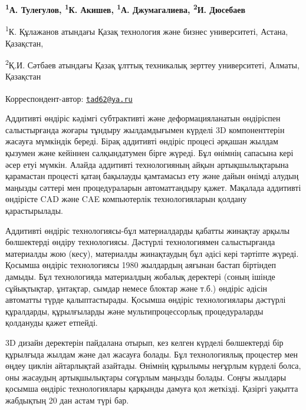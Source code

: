 
\begin{articleheader}

{\bfseries
\textsuperscript{1}А. Тулегулов\textsuperscript{\envelope },
\textsuperscript{1}К. Акишев,
\textsuperscript{1}А. Джумагалиева,
\textsuperscript{2}И. Дюсебаев
}
\end{articleheader}

\begin{affiliation}
\textsuperscript{1}К. Құлажанов атындағы Қазақ технология және бизнес университеті, Астана, Қазақстан,

\textsuperscript{2}Қ.И. Сәтбаев атындағы Қазақ ұлттық техникалық зерттеу университеті, Алматы, Қазақстан

\raggedright \textsuperscript{\envelope }Корреспондент-автор: \href{mailto:tad62@ya.ru}{\nolinkurl{tad62@ya.ru}}
\end{affiliation}

Аддитивті өндіріс кәдімгі субтрактивті және деформацияланатын өндіріспен
салыстырғанда жоғары тұндыру жылдамдығымен күрделі 3D компоненттерін
жасауға мүмкіндік береді. Бірақ аддитивті өндіріс процесі әрқашан жылдам
қызумен және кейіннен салқындатумен бірге жүреді. Бұл өнімнің сапасына
кері әсер етуі мүмкін. Алайда аддитивті технологияның айқын
артықшылықтарына қарамастан процесті қатаң бақылауды қамтамасыз ету және
дайын өнімді алудың маңызды сәттері мен процедураларын автоматтандыру
қажет. Мақалада аддитивті өндірісте CAD және CAE компьютерлік
технологияларын қолдану қарастырылады.

Аддитивті өндіріс технологиясы-бұл материалдарды қабатты жинақтау арқылы
бөлшектерді өндіру технологиясы. Дәстүрлі технологиямен салыстырғанда
материалды жою (кесу), материалды жинақтаудың бұл әдісі кері тәртіпте
жүреді. Қосымша өндіріс технологиясы 1980 жылдардың аяғынан бастап
біртіндеп дамыды. Бұл технологияда материалдың жобалық деректері (соның
ішінде сұйықтықтар, ұнтақтар, сымдар немесе блоктар және т.б.) өндіріс
әдісін автоматты түрде қалыптастырады. Қосымша өндіріс технологиялары
дәстүрлі құралдарды, құрылғыларды және мультипроцессорлық процедураларды
қолдануды қажет етпейді.

3D дизайн деректерін пайдалана отырып, кез келген күрделі бөлшектерді
бір құрылғыда жылдам және дәл жасауға болады. Бұл технологиялық
процестер мен өңдеу циклін айтарлықтай азайтады. Өнімнің құрылымы
неғұрлым күрделі болса, оны жасаудың артықшылықтары соғұрлым маңызды
болады. Соңғы жылдары қосымша өндіріс технологиялары қарқынды дамуға қол
жеткізді. Қазіргі уақытта жабдықтың 20 дан астам түрі бар.

